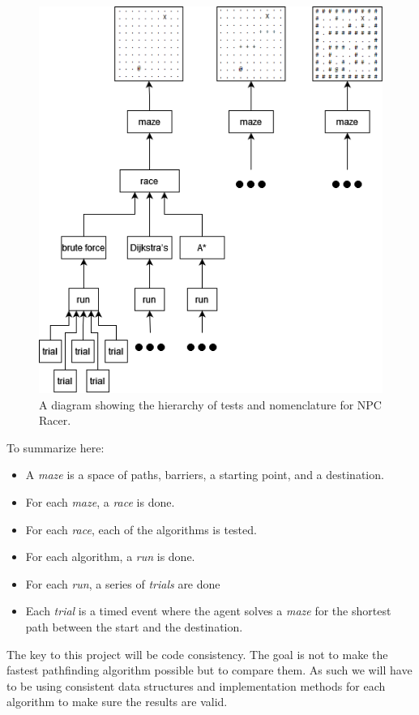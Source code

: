 \documentclass[letterpaper,12pt]{article}  %
\begin{document}
\begin{figure}[h]  %
	\centering  %
	\includegraphics[width = 9 cm ]{NPC_Racer_Hierarchy.drawio.png}
	\caption{A diagram showing the hierarchy of tests and nomenclature for NPC 
	Racer.}
	\label{fig:hierarchy}
\end{figure}

\newpage

To summarize here:
\begin{itemize}
	\item A \textit{maze} is a space of paths, barriers, a starting point, and 
	a destination.
	\item For each \textit{maze}, a \textit{race} is done.
	\item For each \textit{race}, each of the algorithms is tested.
	\item For each algorithm, a \textit{run} is done.
	\item For each \textit{run}, a series of \textit{trials} are done
	\item Each \textit{trial} is a timed event where the agent solves a 
	\textit{maze} for the shortest path between the start and the destination.

\end{itemize}

The key to this project will be code consistency. The goal is not to make the 
fastest pathfinding algorithm possible but to compare them. As such we will 
have to be using consistent data structures and implementation methods for each 
algorithm to make sure the results are valid.
\end{document}

